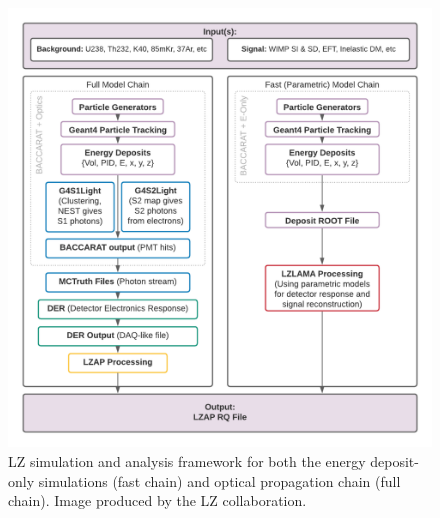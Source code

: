 \begin{figure}
    \centering
    \includegraphics[width=15cm]{Figures/LZ/FullAndFastChains.png}
    \caption{LZ simulation and analysis framework for both the energy deposit-only simulations (fast chain) and optical propagation chain (full chain).
             Image produced by the LZ collaboration.}
    \label{fig:lz_simulation_chain}
\end{figure}







